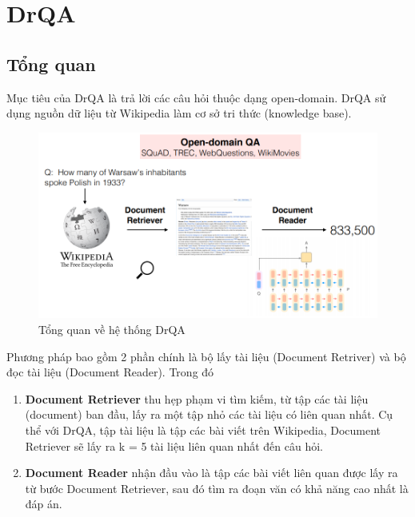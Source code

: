 \section{DrQA}
\subsection{Tổng quan}
Mục tiêu của DrQA là trả lời các câu hỏi thuộc dạng open-domain. DrQA sử dụng nguồn dữ liệu từ
Wikipedia làm cơ sở tri thức (knowledge base).

\begin{figure}[h!]
    \centering
    \includegraphics[scale=0.5]{drqa-overview.jpg}
    \caption{Tổng quan về hệ thống DrQA}
    \label{fig:my_label}
\end{figure}

Phương pháp bao gồm 2 phần chính là bộ lấy tài liệu (Document Retriver) và bộ đọc tài liệu (Document Reader). Trong đó
\begin{enumerate}
    \item \textbf{Document Retriever} thu hẹp phạm vi tìm kiếm, từ tập các tài liệu (document) ban đầu, lấy ra một tập nhỏ các tài liệu có liên quan nhất. Cụ thể với DrQA, tập tài liệu là tập các bài viết trên Wikipedia, Document Retriever sẽ lấy ra  k = 5 tài liệu liên quan nhất đến câu hỏi.
    \item \textbf{Document Reader} nhận đầu vào là tập các bài viết liên quan được lấy ra từ bước Document Retriever, sau đó tìm ra đoạn văn có khả năng cao nhất là đáp án. 
\end{enumerate}

